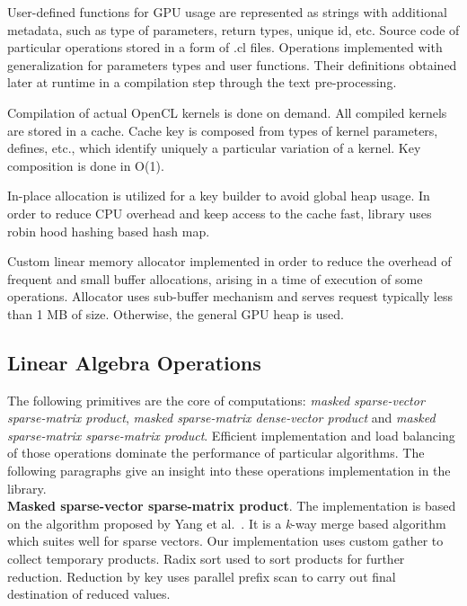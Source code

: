 User-defined functions for GPU usage are represented as strings with additional metadata, such as type of parameters, return types, unique id, etc. Source code of particular operations stored in a form of .cl files. Operations implemented with generalization for parameters types and user functions. Their definitions obtained later at runtime in a compilation step through the text pre-processing. 

Compilation of actual OpenCL kernels is done on demand. All compiled kernels are stored in a cache. Cache key is composed from types of kernel parameters, defines, etc., which identify uniquely a particular variation of a kernel. Key composition is done in O(1). 

In-place allocation is utilized for a key builder to avoid global heap usage. In order to reduce CPU overhead and keep access to the cache fast, library uses robin hood hashing based hash map. 

Custom linear memory allocator implemented in order to reduce the overhead of frequent and small buffer allocations, arising in a time of execution of some operations. Allocator uses sub-buffer mechanism and serves request typically less than 1 MB of size. Otherwise, the general GPU heap is used.

\subsection{Linear Algebra Operations}

The following primitives are the core of computations: \textit{masked sparse-vector sparse-matrix product}, \textit{masked sparse-matrix dense-vector product} and \textit{masked sparse-matrix sparse-matrix product}. Efficient implementation and load balancing of those operations dominate the performance of particular algorithms. The following paragraphs give an insight into these operations implementation in the library.\\

\textbf{Masked sparse-vector sparse-matrix product}. The implementation is based on the algorithm proposed by Yang et al.~\cite{article:spvspm:yang}. It is a \textit{k}-way merge based algorithm which suites well for sparse vectors. Our implementation uses custom gather to collect temporary products. Radix sort used to sort products for further reduction. Reduction by key uses parallel prefix scan to carry out final destination of reduced values.\\

